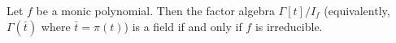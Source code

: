 Let $f$ be a monic polynomial. Then the factor algebra $\Gamma[t]/I_f$ (equivalently, $\Gamma(\bar{t})$ where $\bar{t} = \pi(t)$) is a field if and only if $f$ is irreducible.

